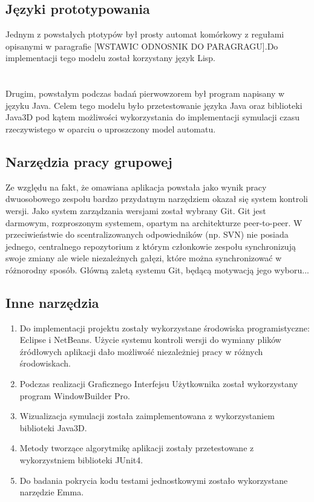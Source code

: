 \subsection{Języki prototypowania}
Jednym z powstałych ptotypów był prosty automat komórkowy z regułami opisanymi w paragrafie [WSTAWIC ODNOSNIK DO PARAGRAGU].Do implementacji tego modelu został korzystany język Lisp.
\\\\
[TUTAJ WSTAWIC ZALETY LISPA DO PROTOTYPOWANIA - WYMYSLISZ COS PRAWDA :>?]
\\
Drugim, powstałym podczas badań pierwowzorem był program napisany w języku Java.
Celem tego modelu było przetestowanie języka Java oraz biblioteki Java3D pod kątem możliwości wykorzystania do implementacji symulacji czasu rzeczywistego w oparciu o uproszczony model automatu. 

\subsection {Narzędzia pracy grupowej}
Ze względu na fakt, że omawiana aplikacja powstała jako wynik pracy dwuosobowego zespołu bardzo przydatnym narzędziem okazał się system kontroli wersji. Jako system zarządzania wersjami został wybrany Git.
Git jest darmowym, rozproszonym systemem, opartym na architekturze peer-to-peer. W przeciwieństwie do scentralizowanych odpowiedników (np. SVN) nie posiada jednego, centralnego repozytorium z którym członkowie zespołu synchronizują swoje zmiany ale wiele niezależnych gałęzi, które można synchronizować w różnorodny sposób. Główną zaletą systemu Git, będącą motywacją jego wyboru...

\subsection{Inne narzędzia}
\begin{enumerate}
\item Do implementacji projektu zostały wykorzystane środowiska programistyczne: Eclipse i NetBeans. Użycie systemu kontroli wersji do wymiany plików źródłowych aplikacji dało możliwość niezależniej pracy w różnych środowiskach.
\item Podczas realizacji Graficznego Interfejsu Użytkownika został wykorzystany program WindowBuilder Pro.
\item Wizualizacja symulacji została zaimplementowana z wykorzystaniem biblioteki Java3D.
\item Metody tworzące algorytmikę aplikacji zostały przetestowane z wykorzystniem biblioteki JUnit4.
\item Do badania pokrycia kodu testami jednostkowymi zostało wykorzystane narzędzie Emma.
\end{enumerate}

